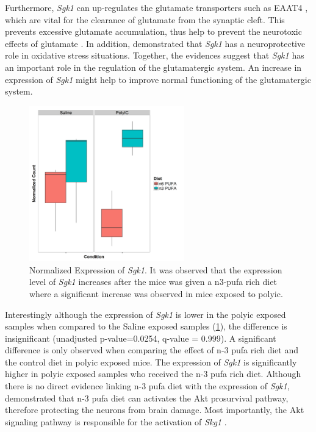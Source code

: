 Furthermore, \textit{Sgk1} can up-regulates the glutamate transporters such as EAAT4 \citep{Bohmer2004}, which are vital for the clearance of glutamate from the synaptic cleft.
This prevents excessive glutamate accumulation, thus help to prevent the neurotoxic effects of glutamate \citep{Lang2010}.
In addition, \citet{Schoenebeck2005} demonstrated that \textit{Sgk1} has a neuroprotective role in oxidative stress situations. 
Together, the evidences suggest that \textit{Sgk1} has an important role in the regulation of the glutamatergic system.
An increase in expression of \textit{Sgk1} might help to improve normal functioning of the glutamatergic system.

\begin{figure}
	\centering
	\includegraphics[width=0.6\textwidth]{figure/omega/Sgk1_expression.png}
	\caption[Normalized Expression of \textit{Sgk1}]{
		Normalized Expression of \textit{Sgk1}.
		It was observed that the expression level of \textit{Sgk1} increases after the mice was given a n3-\gls{pufa} rich diet where a significant increase was observed in mice exposed to \gls{polyic}.
	}\label{fig:sgk1Express}
\end{figure}

Interestingly although the expression of \textit{Sgk1} is lower in the \gls{polyic} exposed samples when compared to the Saline exposed samples (\cref{fig:sgk1Express}), the difference is insignificant (unadjusted p-value=0.0254, q-value = 0.999). 
A significant difference is only observed when comparing the effect of n-3 \gls{pufa} rich diet and the control diet in \gls{polyic} exposed mice.
The expression of \textit{Sgk1} is significantly higher in \gls{polyic} exposed samples who received the n-3 \gls{pufa} rich diet. 
Although there is no direct evidence linking n-3 \gls{pufa} diet with the expression of \textit{Sgk1}, \citet{Zhang2015} demonstrated that n-3 \gls{pufa} diet can activates the Akt prosurvival pathway, therefore protecting the neurons from brain damage.
Most importantly, the Akt signaling pathway is responsible for the activation of \textit{Skg1} \citep{Lang2010}.

